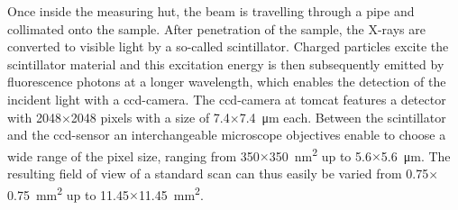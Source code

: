 Once inside the measuring hut, the beam is travelling through a pipe and collimated onto the sample. After penetration of the sample, the X-rays are converted to visible light by a so-called scintillator. Charged particles excite the scintillator material and this excitation energy is then subsequently emitted by fluorescence photons at a longer wavelength, which enables the detection of the incident light with a \ac{ccd}-camera. The \ac{ccd}-camera at \ac{tomcat} features a detector with 2048$\times$2048 pixels with a size of 7.4$\times$\SI{7.4}{\micro\meter} each. Between the scintillator and the \ac{ccd}-sensor an interchangeable microscope objectives enable to choose a wide range of the pixel size, ranging from 350$\times$\SI{350}{\nano\meter\squared} up to 5.6$\times$\SI{5.6}{\micro\meter}. The resulting field of view of a standard scan can thus easily be varied from 0.75$\times$\SI{0.75}{\milli\meter\squared} up to 11.45$\times$\SI{11.45}{\milli\meter\squared}.

